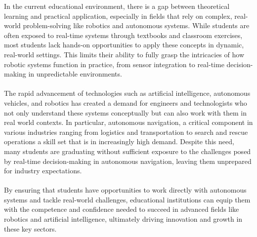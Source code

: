 In the current educational environment, there is a gap between theoretical learning and practical application, especially in fields that rely on complex, real-world problem-solving like robotics and autonomous systems. While students are often exposed to real-time systems through textbooks and classroom exercises, most students lack hands-on opportunities to apply these concepts in dynamic, real-world settings. This limits their ability to fully grasp the intricacies of how robotic systems function in practice, from sensor integration to real-time decision-making in unpredictable environments.
\\\\
The rapid advancement of technologies such as artificial intelligence, autonomous vehicles, and robotics has created a demand for engineers and technologists who not only understand these systems conceptually but can also work with them in real world contexts. In particular, autonomous navigation, a critical component in various industries ranging from logistics and transportation to search and rescue operations a skill set that is in increasingly high demand. Despite this need, many students are graduating without sufficient exposure to the challenges posed by real-time decision-making in autonomous navigation, leaving them unprepared for industry expectations.
\\\\
By ensuring that students have opportunities to work directly with autonomous systems and tackle real-world challenges, educational institutions can equip them with the competence and confidence needed to succeed in advanced fields like robotics and artificial intelligence, ultimately driving innovation and growth in these key sectors.


